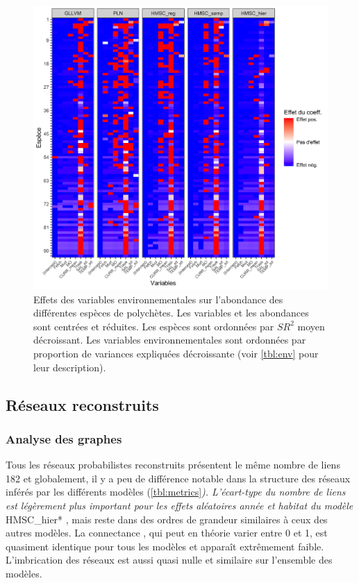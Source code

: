 \documentclass[12pt,]{article}
\makeatletter
\def\maxwidth{\ifdim\Gin@nat@width>\linewidth\linewidth
\else\Gin@nat@width\fi}
\let\Oldincludegraphics\includegraphics
\renewcommand{\includegraphics}[1]{\Oldincludegraphics[width=\maxwidth]{#1}}
\makeatother
\begin{document}
\begin{figure}
\hypertarget{fig:effectenv}{%
\centering
\includegraphics{figures/effect_env.png}
\caption{Effets des variables environnementales sur l'abondance des
différentes espèces de polychètes. Les variables et les abondances sont
centrées et réduites. Les espèces sont ordonnées par \(SR^2\) moyen
décroissant. Les variables environnementales sont ordonnées par
proportion de variances expliquées décroissante (voir \cref{tbl:env}
pour leur description).}\label{fig:effectenv}
}
\end{figure}

\hypertarget{ruxe9seaux-reconstruits}{%
\subsection{Réseaux reconstruits}\label{ruxe9seaux-reconstruits}}

\hypertarget{analyse-des-graphes}{%
\subsubsection{Analyse des graphes}\label{analyse-des-graphes}}

Tous les réseaux probabilistes reconstruits présentent le même nombre de
liens 182 et globalement, il y a peu de différence notable dans la
structure des réseaux inférés par les différents modèles
(\cref{tbl:metrics}\emph{). L'écart-type du nombre de liens est
légèrement plus important pour les effets aléatoires année et habitat du
modèle }HMSC\_hier* , mais reste dans des ordres de grandeur similaires
à ceux des autres modèles. La connectance , qui peut en théorie varier
entre 0 et 1, est quasiment identique pour tous les modèles et apparaît
extrêmement faible. L'imbrication des réseaux est aussi quasi nulle et
similaire sur l'ensemble des modèles.
\end{document}
